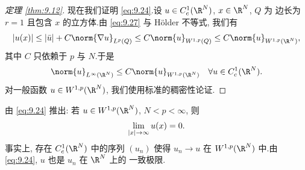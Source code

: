 \begin{proof}[定理 \ref{thm:9.12}]
现在我们证明 \eqref{eq:9.24}.设 $u\in C_c^1(\R^N)$, $x\in\R^N$, $Q$ 为
边长为 $r=1$ 且包含 $x$ 的立方体.由 \eqref{eq:9.27} 与 Hölder 不等式,
我们有
\begin{equation*}
\abs{u(x)}\le\abs{\bar u}+C\norm{\nabla u}_{L^p(Q)}
\le C\norm{u}_{W^{1,p}(Q)}\le C\norm{u}_{W^{1,p}(\R^N)},
\end{equation*}
其中 $C$ 只依赖于 $p$ 与 $N$.于是
\begin{equation*}
\norm{u}_{L^\infty(\R^N)}\le C\norm{u}_{W^{1,p}(\R^N)}
\quad\forall u\in C_c^1(\R^N).
\end{equation*}
对一般函数 $u\in W^{1,p}(\R^N)$, 我们使用标准的稠密性论证.
\end{proof}

\begin{remark}
\label{rem:9.12}
由 \eqref{eq:9.24} 推出: 若 $u\in W^{1,p}(\R^N)$, $N<p<\infty$, 则
\begin{equation*}
\lim_{\left|x\right|\to\infty}u(x)=0.
\end{equation*}
事实上, 存在 $C_c^1(\R^N)$ 中的序列 $(u_n)$ 使得 $u_n\to u$ 在
$W^{1,p}(\R^N)$ 中.由 \eqref{eq:9.24}, $u$ 也是 $u_n$ 在 $\R^N$ 上的
一致极限.
\end{remark}

